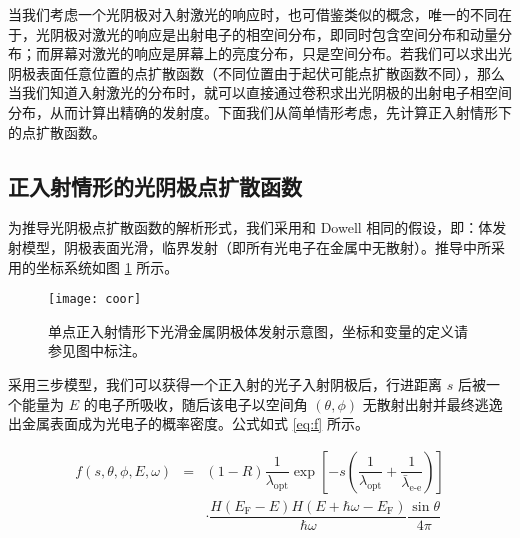 当我们考虑一个光阴极对入射激光的响应时，也可借鉴类似的概念，唯一的不同在于，光阴极对激光的响应是出射电子的相空间分布，即同时包含空间分布和动量分布；而屏幕对激光的响应是屏幕上的亮度分布，只是空间分布。若我们可以求出光阴极表面任意位置的点扩散函数（不同位置由于起伏可能点扩散函数不同），那么当我们知道入射激光的分布时，就可以直接通过卷积求出光阴极的出射电子相空间分布，从而计算出精确的发射度。下面我们从简单情形考虑，先计算正入射情形下的点扩散函数。

\subsection{正入射情形的光阴极点扩散函数}
为推导光阴极点扩散函数的解析形式，我们采用和 Dowell 相同的假设，即：体发射模型，阴极表面光滑，临界发射（即所有光电子在金属中无散射）。推导中所采用的坐标系统如图 \ref{fig:coor} 所示。

\begin{figure}[htbp]
\centering
\texttt{[image: coor]}
\caption{\label{fig:coor} 单点正入射情形下光滑金属阴极体发射示意图，坐标和变量的定义请参见图中标注。}
\end{figure}

采用三步模型，我们可以获得一个正入射的光子入射阴极后，行进距离 $s$ 后被一个能量为 $E$ 的电子所吸收，随后该电子以空间角 $(\theta, \phi)$ 无散射出射并最终逃逸出金属表面成为光电子的概率密度。公式如式 \ref{eq:f} 所示。

\begin{eqnarray}
f(s, \theta, \phi, E, \omega) &=& (1-R)\dfrac{1}{\lambda_{\text{opt}}}\exp\left[-s\left(\dfrac{1}{\lambda_{\text{opt}}} + \dfrac{1}{\bar{\lambda}_{\text{e-e}}}\right)\right]\nonumber\\
&&\cdot\dfrac{H(E_\text{F}-E)H(E+\hbar\omega-E_\text{F})}{\hbar\omega}\dfrac{\sin\theta}{4\pi}
\label{eq:f}
\end{eqnarray}

